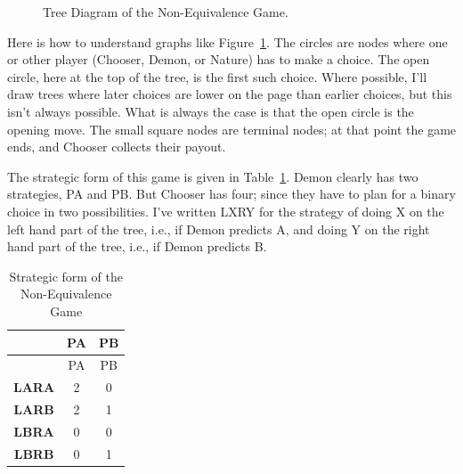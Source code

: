 \documentclass[
  12pt,
  letterpaper,
  DIV=11,
  numbers=noendperiod]{scrreprt}
\begin{document}
\begin{figure}


\caption{\label{fig-subgame-example}Tree Diagram of the Non-Equivalence
Game.}

\end{figure}%

Here is how to understand graphs like Figure~\ref{fig-subgame-example}.
The circles are nodes where one or other player (Chooser, Demon, or
Nature) has to make a choice. The open circle, here at the top of the
tree, is the first such choice. Where possible, I'll draw trees where
later choices are lower on the page than earlier choices, but this isn't
always possible. What is always the case is that the open circle is the
opening move. The small square nodes are terminal nodes; at that point
the game ends, and Chooser collects their payout.

The strategic form of this game is given in
Table~\ref{tbl-subgame-example}. Demon clearly has two strategies, PA
and PB. But Chooser has four; since they have to plan for a binary
choice in two possibilities. I've written LXRY for the strategy of doing
X on the left hand part of the tree, i.e., if Demon predicts A, and
doing Y on the right hand part of the tree, i.e., if Demon predicts B.

\begin{longtable}[]{@{}ccc@{}}
\caption{Strategic form of the Non-Equivalence
Game}\label{tbl-subgame-example}\tabularnewline
\toprule\noalign{}
& PA & PB \\
\midrule\noalign{}
\endfirsthead
\toprule\noalign{}
& PA & PB \\
\midrule\noalign{}
\endhead
\bottomrule\noalign{}
\endlastfoot
\textbf{LARA} & 2 & 0 \\
\textbf{LARB} & 2 & 1 \\
\textbf{LBRA} & 0 & 0 \\
\textbf{LBRB} & 0 & 1 \\
\end{longtable}
\end{document}
